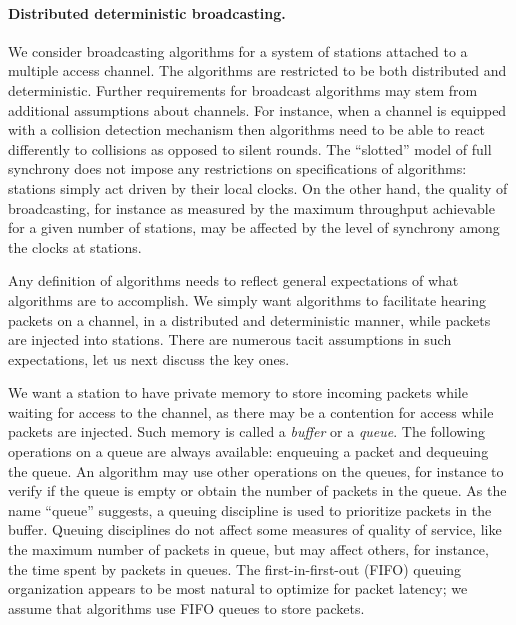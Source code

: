 \documentclass[11pt]{article}
\newcommand{\BBB}{\vspace*{-\bigskipamount}}
\newcommand{\Paragraph}[1]{\BBB\paragraph{#1}}
\begin{document}

\Paragraph{Distributed deterministic broadcasting.}




We consider broadcasting algorithms for a system of stations attached to a multiple access channel.
The algorithms are restricted to be both distributed and deterministic.
Further requirements for broadcast algorithms may stem from additional assumptions about channels.
For instance, when a channel is equipped with a collision detection mechanism then algorithms need to be able to react differently to collisions as opposed to silent rounds.
The ``slotted'' model of full synchrony does not impose any restrictions on specifications of algorithms: stations simply act driven by their local clocks.
On the other hand, the quality of broadcasting, for instance as measured by the maximum throughput achievable for a given number of stations, may be affected by the level of synchrony among the clocks at stations.

Any definition of algorithms needs to reflect general expectations of what algorithms are to accomplish.
We simply want algorithms to facilitate hearing packets on a channel, in a distributed and deterministic manner, while packets are injected into stations.
There are numerous tacit assumptions in such expectations, let us next discuss the key ones.

We want a station to have private memory to store incoming packets while waiting for access to the channel, as there may be a contention for access while packets are injected.
Such memory is called a \emph{buffer} or a \emph{queue}.
The following operations on a queue are always available: enqueuing a packet and dequeuing the queue.
An algorithm may use other operations on the queues, for instance to verify if the queue is empty or obtain the number of packets in the queue.
As the name ``queue'' suggests, a queuing discipline is used to prioritize packets in the buffer.
Queuing disciplines do not affect some measures of quality of service, like the maximum number of packets in queue, but may affect others, for instance, the time spent by packets in queues.
The first-in-first-out (FIFO) queuing organization appears to be most natural to optimize for packet latency; we assume that algorithms use FIFO queues to store packets.
\end{document}
